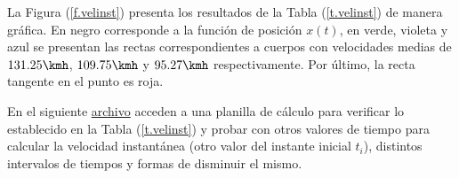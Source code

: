 La Figura (\ref{f.velinst}) presenta los resultados de la Tabla
(\ref{t.velinst}) de manera gráfica. En negro corresponde a la función de
posición $x(t)$, en verde, violeta y azul se presentan las rectas
correspondientes a cuerpos con velocidades medias de $131.25\kmh$, $109.75\kmh$
y $95.27\kmh$ respectivamente. Por último, la recta tangente en el punto es 
roja.




En el siguiente 
\href{https://drive.google.com/open?id=1bQr\_anDE0co2UJfpLdKI5xJT9iGHT3MXe3RD\_4yxqZQ}
{archivo} acceden a una planilla de cálculo para verificar lo establecido
en la Tabla (\ref{t.velinst}) y probar con otros valores de tiempo para calcular
la velocidad instantánea (otro valor del instante inicial $t_i$), distintos
intervalos de tiempos y formas de disminuir el mismo.

